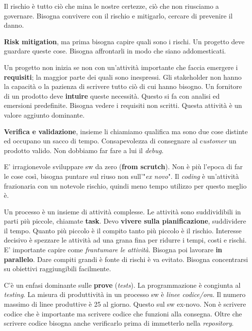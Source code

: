 
Il rischio è tutto ciò che mina le nostre certezze, ciò che non riusciamo a governare. Bisogna convivere con il rischio e mitigarlo, cercare di prevenire il danno.

\textbf{Risk mitigation}, ma prima bisogna capire quali sono i rischi. Un progetto deve guardare queste cose. Bisogna affrontarli in modo che siano addomesticati.

Un progetto non inizia se non con un'attività importante che faccia emergere i \textbf{requisiti}; la maggior parte dei quali sono inespressi. Gli stakeholder non hanno la capacità o la pazienza di scrivere tutto ciò di cui hanno bisogno. Un fornitore di un prodotto deve \textbf{intuire} queste necessità. Questo si fa con analisi ed emersioni predefinite. Bisogna vedere i requisiti non scritti. Questa attività è un valore aggiunto dominante.

\textbf{Verifica e validazione}, insieme li chiamiamo qualifica ma sono due cose distinte ed occupano un sacco di tempo. Consapevolezza di consegnare al c\textit{ustomer} un prodotto valido. Non dobbiamo far fare a lui il \textit{debug}.

E' irragionevole sviluppare sw da zero (\textbf{from scrutch}). Non è più l'epoca di far le cose così, bisogna puntare sul riuso non sull'"\textit{ex novo}". Il \textit{coding} è un'attività frazionaria con un notevole rischio, quindi meno tempo utilizzo per questo meglio è.

Un processo è un insieme di attività complesse. Le attività sono suddividibili in parti più piccole, chiamate \textbf{task}. Devo \textbf{vivere sulla pianificazione}, suddividere il tempo. Quanto più piccolo è il compito tanto più piccolo è il rischio. Interesse decisivo è spezzare le attività ad una grana fina per ridurre i tempi, costi e rischi. E' importante capire come \textit{frantumare le attività}. Bisogna poi lavorare \textbf{in parallelo}. Dare compiti grandi è fonte di rischi è va evitato. Bisogna concentrarsi su obiettivi raggiungibili facilmente.

C'è un enfasi dominante sulle \textbf{prove} (\textit{tests}). La programmazione è congiunta al \textit{testing}. La misura di produttività in un processo sw è \textit{linee codice/ora}. Il numero massimo di linee produttive è 25 al giorno. Questo sul sw ex-novo. Non è scrivere codice che è importante ma scrivere codice che funzioni alla consegna. Oltre che scrivere codice bisogna anche verificarlo prima di immetterlo nella \textit{repository}.

